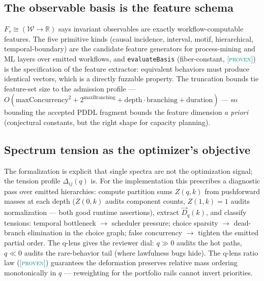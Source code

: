\documentclass[11pt]{article}
\newcommand{\PROVEN}{\textcolor{teal}{\textsc{[proven]}}}
\newcommand{\WS}{\mathcal{W}}                  %
\newcommand{\tmap}{\tau}                       %
\newcommand{\R}{\mathbb{R}}
\theoremstyle{plain}
\theoremstyle{definition}
\begin{document}
\subsection{The observable basis is the feature schema}
$F_\tmap \cong (\WS \to \R)$ says invariant observables are exactly
workflow-computable features. The five primitive kinds (causal incidence,
interval, motif, hierarchical, temporal-boundary) are the candidate feature
generators for process-mining and ML layers over emitted workflows, and
\texttt{evaluateBasis} (fiber-constant, \PROVEN) is the specification of the
feature extractor: equivalent behaviors must produce identical vectors, which
is a directly fuzzable property. The truncation bounds tie feature-set size
to the admission profile ---
$O(\mathrm{maxConcurrency}^2 + 2^{\mathrm{maxBranching}} +
\mathrm{depth}\cdot\mathrm{branching} + \mathrm{duration})$ --- so bounding
the accepted PDDL fragment bounds the feature dimension \emph{a priori}
(conjectural constants, but the right shape for capacity planning).

\subsection{Spectrum tension as the optimizer's objective}
The formalization is explicit that single spectra are not the optimization
signal; the tension profile $\Delta_{ij}(q)$ is. For the implementation this
prescribes a diagnostic pass over emitted hierarchies: compute partition
sums $Z(q,k)$ from pushforward masses at each depth ($Z(0,k)$ audits
component counts, $Z(1,k) = 1$ audits normalization --- both good runtime
assertions), extract $\vec{D}_q(k)$, and classify tensions: temporal
bottleneck $\to$ scheduler pressure; choice sparsity $\to$ dead-branch
elimination in the choice graph; false concurrency $\to$ tighten the emitted
partial order. The q-lens gives the reviewer dial: $q \gg 0$ audits the hot
paths, $q \ll 0$ audits the rare-behavior tail (where lawfulness bugs
hide). The q-lens ratio law (\PROVEN) guarantees the deformation preserves
relative mass ordering monotonically in $q$ --- reweighting for the portfolio
rails cannot invert priorities.
\end{document}
